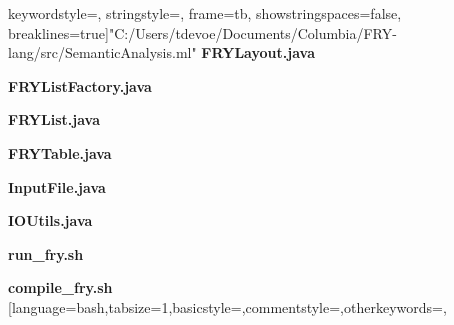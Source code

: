 \documentclass{article}
\begin{document}
keywordstyle=\ttb\color{deepblue},
stringstyle=\color{deepgreen},
frame=tb,
showstringspaces=false,
breaklines=true]{"C:/Users/tdevoe/Documents/Columbia/FRY-lang/src/SemanticAnalysis.ml"}
{\large \textbf{FRYLayout.java}}

{\large \textbf{FRYListFactory.java}}

{\large \textbf{FRYList.java}}

{\large \textbf{FRYTable.java}}

{\large \textbf{InputFile.java}}

{\large \textbf{IOUtils.java}}

{\large \textbf{run\_fry.sh}}

{\large \textbf{compile\_fry.sh}}
[language=bash,tabsize=1,basicstyle=\ttm,commentstyle=\color{comment}\ttm,otherkeywords={},
\end{document}
